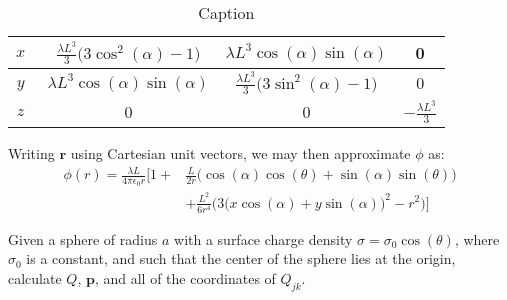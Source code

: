 \documentclass[crop=false,class=book,oneside]{standalone}
\begin{document}
\begin{solution}
\begin{table}[H]
\begin{tabular}{|c|c|c|c|}
                        $x\phantom{\bigg(}$&
                        $\frac{\lambda{L}^3}{3}\big(3\cos^{2}(\alpha)-1\big)$&
                        $\lambda{L}^{3}\cos(\alpha)\sin(\alpha)$&0\\
                        \hline
                        $y\phantom{\bigg(}$&
                        $\lambda{L}^{3}\cos(\alpha)\sin(\alpha)$&
                        $\frac{\lambda{L}^3}{3}\big(3\sin^{2}(\alpha)-1\big)$&0\\
                        \hline
                        $z\phantom{\bigg(}$&
                        0&0&$\minus\frac{\lambda{L}^{3}}{3}$\\
                        \hline
                    \end{tabular}
                    \caption{Caption}
                    \label{tab:my_label}
                \end{table}
                Writing $\mathbf{r}$ using Cartesian unit vectors,
                we may then approximate $\phi$ as:
                \begin{equation}
                    \begin{split}
                        \phi(r)=\frac{\lambda{L}}{4\pi\epsilon_{0}r}
                            \Big[1+&\frac{L}{2r}
                                \big(\cos(\alpha)\cos(\theta)+
                                     \sin(\alpha)\sin(\theta)\big)\\
                                &+\frac{L^{2}}{6r^{4}}
                                \Big(3\big(x\cos(\alpha)+
                                     y\sin(\alpha)\big)^{2}-r^{2}\Big)
                            \Big]
                    \end{split}
                \end{equation}
            \end{solution}
            \begin{problem}
                Given a sphere of radius $a$ with a surface charge density
                $\sigma=\sigma_{0}\cos(\theta)$, where $\sigma_{0}$ is a
                constant, and such that the center of the sphere lies at
                the origin, calculate $Q$, $\mathbf{p}$, and all of the
                coordinates of $Q_{jk}$.
            \end{problem}
\end{document}
